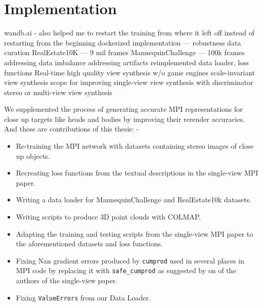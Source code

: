 \section{Implementation}\label{sec:implementation} 



wandb.ai - also helped me to restart the training from where it left off instead of restarting from the beginning
dockerized implementation — robustness
data curation
RealEstate10K		—	9 mil frames
MannequinChallenge	—	100k frames
addressing data imbalance 
addressing artifacts
reimplemented data loader, loss functions  
Real-time high quality view synthesis w/o game engines
scale-invariant view synthesis
scope for improving single-view view synthesis with discriminator 
stereo or multi-view view synthesis

We supplemented the process of generating accurate MPI representations for close up targets like heads and bodies by improving their rerender accuracies. And these are contributions of this thesis: -
\begin{itemize}
    \item Re-training the MPI network with datasets containing stereo images of close up objects.  
    \item Recreating loss functions from the textual descriptions in the single-view MPI paper.
    \item Writing a data loader for MannequinChallenge and RealEstate10k datasets.
    \item Writing scripts to produce 3D point clouds with COLMAP.
    \item Adapting the training and testing scripts from the single-view MPI paper to the aforementioned datasets and loss functions.
    \item Fixing Nan gradient errors produced by \texttt{cumprod} used in several places in MPI code by replacing it with \texttt{safe\_cumprod} as suggested by on of the authors of the single-view paper.
    \item Fixing \texttt{ValueErrors} from our Data Loader.
\end{itemize}


